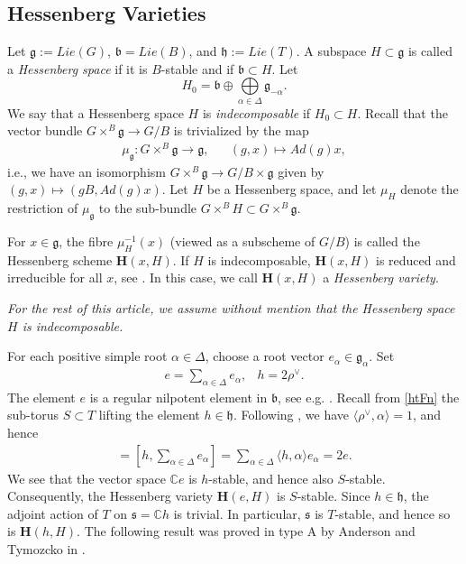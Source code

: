 \documentclass[10pt]{article}
\numberwithin{thm}{section}
\theoremstyle{definition}
\theoremstyle{remark}
\newcommand{\bo}{\ensuremath{\mathfrak b}}
\newcommand{\g}{\ensuremath{\mathfrak g}}
\newcommand{\car}{\ensuremath{\mathfrak h}}
\newcommand{\Hess}{\mathbf H}
\newcommand{\IC}{\mathbb C}
\begin{document}
\subsection{Hessenberg Varieties}
Let $\g:= Lie(G)$, $\bo=Lie(B)$, and $\car:=Lie(T)$.
A subspace $H\subset\g$ is called a \emph{Hessenberg space} if it is $B$-stable and if $\bo\subset H$.
Let
\begin{equation*}
H_0=\bo\oplus\bigoplus\limits_{\alpha\in\Delta}\g_{-\alpha}.
\end{equation*}
We say that a Hessenberg space $H$ is \emph{indecomposable} if $H_0\subset H$.
Recall that the vector bundle $G\times^B\g\to G/B$ is trivialized by the map
\begin{align*}
\mu_\g:G\times^B\g\to\g,&&(g,x)\mapsto Ad(g)x,
\end{align*}
i.e., we have an isomorphism $G\times^B\g\to G/B\times\g$ given by
$(g,x)\mapsto (gB,Ad(g)x)$.
Let $H$ be a Hessenberg space, 
and let $\mu_H$ denote the restriction of $\mu_{\mathfrak g}$ to the sub-bundle $G\times^BH\subset G\times^B\g$.
\begin{center}
\end{center}
For $x\in\g$, the fibre $\mu_H^{-1}(x)$ (viewed as a subscheme of $G/B$) is called the Hessenberg scheme $\Hess(x,H)$.
If $H$ is indecomposable, $\Hess(x,H)$ is reduced and irreducible for all $x$,
see \cite[Thm 1.2]{abe.fujita.zeng}.
In this case, we call $\Hess(x,H)$ a \emph{Hessenberg variety}.

\emph{
For the rest of this article,
we assume without mention that the Hessenberg space $H$ is indecomposable.
}

For each positive  simple root $\alpha\in \Delta$,
choose a root vector $e_\alpha \in \mathfrak{g}_\alpha$.
Set 
\begin{align}\label{eq:hande}
&e= \sum_{\alpha \in\Delta} e_\alpha,& h=2\rho^\vee.&
\end{align}
The element $e$ is a regular nilpotent element in \bo,
see e.g. \cite{mcgovern.collingwood:nilpotent.orbits,kostant:principal}.
Recall from \cref{htFn} the sub-torus $S\subset T$ lifting the element $h\in\car$.
Following \cite[Ch~6, Prop 29]{bourbaki:Lie46}, we have $\langle\rho^\vee,\alpha\rangle=1$,
and hence
\begin{align*}
[h,e]=[h,\sum_{\alpha\in\Delta} e_\alpha]=\sum_{\alpha\in\Delta} \langle h,\alpha\rangle e_\alpha=2e.
\end{align*}
We see that the vector space $\IC e$ is $h$-stable, and hence also $S$-stable.
Consequently, the Hessenberg variety $\Hess(e,H)$ is $S$-stable.
Since $h\in\car$, the adjoint action of $T$ on $\mathfrak s=\IC h$ is trivial.
In particular, $\mathfrak s$ is $T$-stable, and hence so is $\Hess(h,H)$.
The following result was proved in type A by Anderson and Tymozcko in \cite{MR2609167}.
\end{document}

